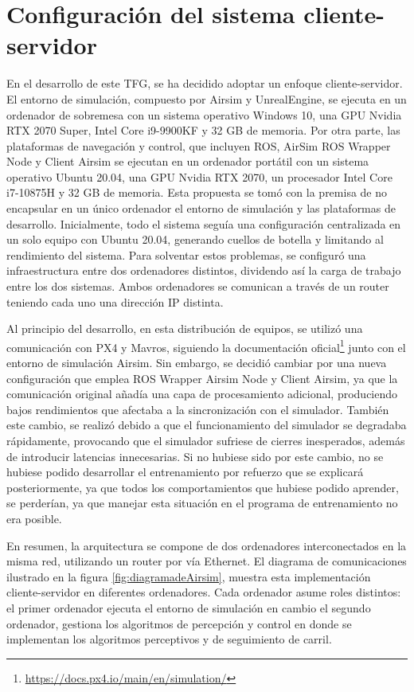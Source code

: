 \section{Configuración del sistema cliente-servidor}
\label{distribución}
En el desarrollo de este TFG, se ha decidido adoptar un enfoque cliente-servidor. El entorno de simulación, compuesto por Airsim y UnrealEngine, se ejecuta en un ordenador de sobremesa con un sistema 
operativo Windows 10, una GPU Nvidia RTX 2070 Super, Intel Core i9-9900KF y 32 GB de memoria. Por otra parte, las plataformas de navegación y control, que incluyen ROS, AirSim ROS Wrapper Node y 
Client Airsim se ejecutan en un ordenador
portátil con un sistema operativo Ubuntu 20.04, una GPU Nvidia RTX 2070, un procesador Intel Core i7-10875H y 32 GB de memoria.
Esta propuesta se tomó con la premisa de no encapsular en un único ordenador el entorno de simulación y las plataformas de desarrollo. Inicialmente, todo el sistema 
seguía una configuración centralizada en un solo equipo con Ubuntu 20.04, generando cuellos de botella y limitando al rendimiento del sistema. Para solventar estos problemas, 
se configuró una infraestructura entre dos ordenadores distintos, dividendo así la carga de trabajo entre los dos sistemas. Ambos ordenadores se comunican a través de un router teniendo 
cada uno una dirección IP distinta. 

Al principio del desarrollo, en esta distribución de equipos, se utilizó una comunicación con PX4 y Mavros, siguiendo la documentación oficial\footnote{\url{https://docs.px4.io/main/en/simulation/}} 
junto con el entorno de simulación Airsim. Sin embargo, se decidió cambiar por una nueva configuración que emplea ROS Wrapper Airsim Node y Client Airsim, ya que 
la comunicación original añadía una capa de procesamiento adicional, produciendo bajos rendimientos que afectaba a la sincronización con el simulador. 
También este cambio, se realizó debido a que el funcionamiento del simulador se degradaba rápidamente, provocando que el simulador sufriese
de cierres inesperados, además de introducir latencias innecesarias. Si no hubiese sido por este cambio, no se hubiese podido desarrollar el entrenamiento por refuerzo que se explicará posteriormente,
ya que todos los comportamientos que hubiese podido aprender, se perderían, ya que manejar esta situación en el programa de entrenamiento no era posible.

En resumen, la arquitectura se compone de dos ordenadores interconectados en la misma red, utilizando un router por vía Ethernet. El diagrama 
de comunicaciones ilustrado en la figura \ref{fig:diagramadeAirsim}, muestra esta implementación cliente-servidor en diferentes ordenadores. Cada ordenador asume roles distintos: 
el primer ordenador ejecuta el entorno de simulación en cambio el segundo ordenador, gestiona los algoritmos de percepción y control en donde se implementan los algoritmos perceptivos y de seguimiento de carril. 

